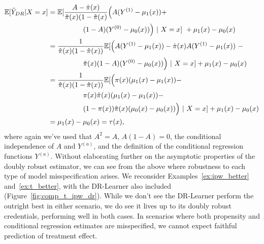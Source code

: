 \documentclass[../thesis.tex]{subfiles}
\begin{document}
\begin{align*}
    \bbE[\Tilde{Y}_{DR} | X = x] & = \bbE [\frac{A - \pihat(x)}{\pihat(x)(1 - \pihat(x)} \Big( A (Y^{(1)} - \mu_1(x)) + \\
    &\hspace{50pt} (1-A)(Y^{(0)} - \mu_0(x)) \Big) \ | \ X=x] \ +  \mu_1(x) - \mu_0(x)  \\
    & = \frac{1}{\pihat(x)(1-\pihat(x))} \bbE [ \Big( A(Y^{(1)} - \mu_1(x)) -\pihat(x)A(Y^{(1)} - \mu_1(x)) \ - \\
    & \hspace{50pt} \pihat(x) (1-A)(Y^{(0)} - \mu_0(x))\Big) \ | \ X=x] + \mu_1(x) - \mu_0(x) \\
    & = \frac{1}{\pihat(x)(1-\pihat(x))} \bbE [\Big( \pi(x) (\mu_1(x) - \mu_1(x)) - \\
    & \hspace{50pt} \pi(x)\pihat(x)(\mu_1(x) - \mu_1(x)) - \\
    & \hspace{50pt} (1-\pi(x))\pihat(x)(\mu_0(x) - \mu_0(x)) \Big) \ | \ X=x ] + \mu_1(x) - \mu_0(x) \\
    & = \mu_1(x) - \mu_0(x) = \tau(x),
\end{align*}
where again we've used that $A^2 = A$, $A(1-A) = 0$, the conditional independence of $A$ and $Y^{(a)}$, and the definition of the conditional regression functions $Y^{(a)}$.
Without elaborating further on the asymptotic properties of the doubly robust estimator, we can see from the above where robustness to each type of model misspecification arises. We reconsider Examples~\ref{ex:ipw_better} and~\ref{ex:t_better}, with the DR-Learner also included (Figure~\ref{fig:comp_t_ipw_dr}). While we don't see the DR-Learner perform the outright best in either scenario, we do see it lives up to its doubly robust credentials, performing well in both cases. In scenarios where both propensity and conditional regression estimates are misspecified, we cannot expect faithful prediction of treatment effect.
\end{document}
